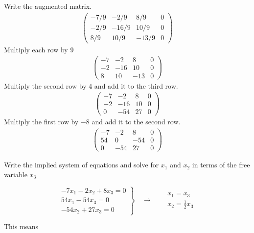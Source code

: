 \documentclass[12pt]{article}
\begin{document}
Write the augmented matrix.
\begin{align*}
\left(\begin{array}{rrr|r}
-7 / 9 & -2 / 9 & 8 / 9 & 0 \\
-2 / 9 & -16 / 9 & 10 / 9 & 0 \\
8 / 9 & 10 / 9 & -13 / 9 & 0
\end{array}\right)
\end{align*}
Multiply each row by \(9\)
\begin{align*}
\left(\begin{array}{rrr|r}
-7 & -2 & 8 & 0 \\
-2 & -16 & 10 & 0 \\
8 & 10 & -13 & 0
\end{array}\right)
\end{align*}
Multiply the second row by 4 and add it to the third row.
\begin{align*}
\left(\begin{array}{rrr|r}
-7 & -2 & 8 & 0 \\
-2 & -16 & 10 & 0 \\
0 & -54 & 27 & 0
\end{array}\right)
\end{align*}
Multiply the first row by \(-8\) and add it to the second row.
\begin{align*}
\left(\begin{array}{rrr|r}
-7 & -2 & 8 & 0 \\
54 & 0 & -54 & 0 \\
0 & -54 & 27 & 0
\end{array}\right)
\end{align*}

Write the implied system of equations and
solve for \(x_1\) and \(x_2\) in terms of the free variable \(x_3\)

\begin{equation*}
\left.\begin{array}{r}
-7 x_{1}-2 x_{2}+8 x_{3}=0 \\
54 x_{1}-54 x_{3}=0 \\
-54 x_{2}+27 x_{3}=0
\end{array}\right\} \quad \rightarrow \quad \begin{aligned}
& x_{1}=x_{3} \\
& x_{2}=\frac{1}{2} x_{3}
\end{aligned}
\end{equation*}

This means
\end{document}
